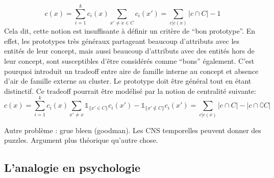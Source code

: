 \documentclass[french]{article}
\begin{document}
				\begin{equation}
				c(x) = \sum_{i = 1}^{k}c_i(x)\sum_{x' \neq x \in C}c_i(x') = \sum_{c| c(x)}|c\cap C|-1
				\end{equation}
				Cela dit, cette notion est insuffisante à définir un critère de ``bon prototype''. En effet, les prototypes très généraux partageant beaucoup d'attributs avec les entités de leur concept, mais aussi beaucoup d'attributs avec des entités hors de leur concept, sont susceptibles d'être considérés comme ``bons'' également. C'est pourquoi \cite{rosch1975} introduit un tradeoff entre aire de famille interne au concept et absence d'air de famille externe au cluster. Le prototype doit être général tout en étant distinctif. Ce tradeoff pourrait être modélisé par la notion de centralité suivante:
				\begin{equation}
				c(x) = \sum_{i = 1}^{k}c_i(x)\sum_{x' \neq x}\mathds{1}_{\lbrace x' \in C \rbrace}c_i(x') - \mathds{1}_{\lbrace x' \notin C \rbrace}c_i(x') = \sum_{c| c(x)}|c\cap C| - |c \cap \complement C|
				\end{equation}
				
				
				
	
		
		Autre problème : grue bleen (goodman). Les CNS temporelles peuvent donner des puzzles. Argument plus théorique qu'autre chose.
		
		
		
		
		\subsection{L'analogie en psychologie}
\end{document}
